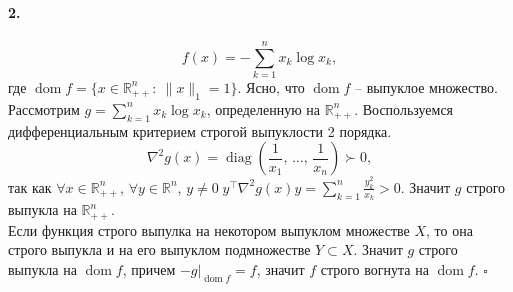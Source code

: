 \documentclass{article}
\DeclareMathOperator{\dom}{dom}
\DeclareMathOperator{\diag}{diag}
\newcommand*{\QED}{\null\nobreak\hfill\ensuremath{\square}}%
\newcommand*{\R}{\mathbb{R}}
\begin{document}
\paragraph{2.}
\[ f(x) = -\sum\limits_{k = 1}^n x_k \log x_k, \]
где $\dom f = \{ x \in \R^n_{++} :\: \| x \|_1 = 1 \}$. Ясно, что $\dom f$ -- выпуклое множество. \\
Рассмотрим $g = \sum\limits_{k = 1}^n x_k \log x_k$, определенную на $\R_{++}^n$. Воспользуемся дифференциальным критерием строгой выпуклости 2 порядка.
\[ \nabla^2 g(x) = \diag\left(\frac{1}{x_1},\,\dotsc,\,\frac{1}{x_n}\right) \succ 0, \]
так как $ \forall x \in \R_{++}^n,\, \forall y \in \R^n,\, y \neq 0 \; y^\top \nabla^2 g(x) y = \sum\limits_{k = 1}^n \frac{y_k^2}{x_k} > 0 $. Значит $g$ строго выпукла на $\R_{++}^n$. \\
Если функция строго выпулка на некотором выпуклом множестве $X$, то она строго выпукла и на его выпуклом подмножестве $Y \subset X$. Значит $g$ строго выпукла на $ \dom f $, причем $ -g |_{\dom f} = f $, значит $f$ строго вогнута на $\dom f$. \QED
\end{document}
